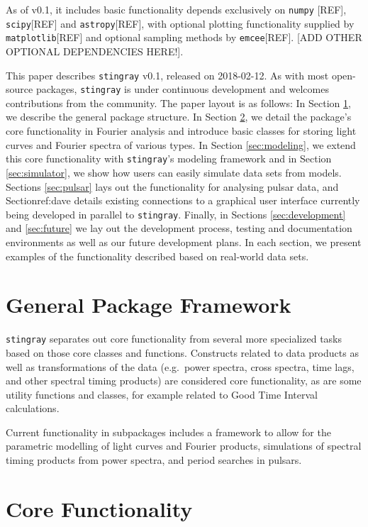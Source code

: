 \documentclass[12pt]{emulateapj}
\newcommand{\stingray}{\texttt{stingray}\xspace}
\begin{document}
As of v0.1, it includes basic functionality depends exclusively on \texttt{numpy} [REF], \texttt{scipy}[REF] and \texttt{astropy}[REF], with optional plotting functionality supplied by \texttt{matplotlib}[REF] and optional sampling methods by \texttt{emcee}[REF]. [ADD OTHER OPTIONAL DEPENDENCIES HERE!].

This paper describes \stingray v0.1, released on 2018-02-12. 
As with most open-source packages, \stingray is under continuous development and welcomes contributions from the community.
The paper layout is as follows: 
In Section \ref{sec:general_package}, we describe the general package structure. 
In Section \ref{sec:core}, we detail the package's core functionality in Fourier analysis and introduce basic classes for storing light curves and Fourier spectra of various types. 
In Section \ref{sec:modeling}, we extend this core functionality with \stingray's modeling framework and in Section \ref{sec:simulator}, we show how users can easily simulate data sets from models. 
Sections \ref{sec:pulsar} lays out the functionality for analysing pulsar data, and Section{ref:dave} details existing connections to a graphical user interface currently being developed in parallel to \stingray. 
Finally, in Sections \ref{sec:development} and \ref{sec:future} we lay out the development process, testing and documentation environments as well as our future development plans. 
In each section, we present examples of the functionality described based on real-world data sets.

\section{General Package Framework}
\label{sec:general_package}

\stingray separates out core functionality from several more specialized tasks based on those core classes and functions. Constructs related to data products as well as transformations of the data (e.g.\ power spectra, cross spectra, time lags, and other spectral timing products) are considered core functionality, as are some utility functions and classes, for example related to Good Time Interval calculations. 

Current functionality in subpackages includes a framework to allow for the parametric modelling of light curves and Fourier products, simulations of spectral timing products from power spectra, and period searches in pulsars.


\section{Core Functionality}
\label{sec:core}
\end{document}

